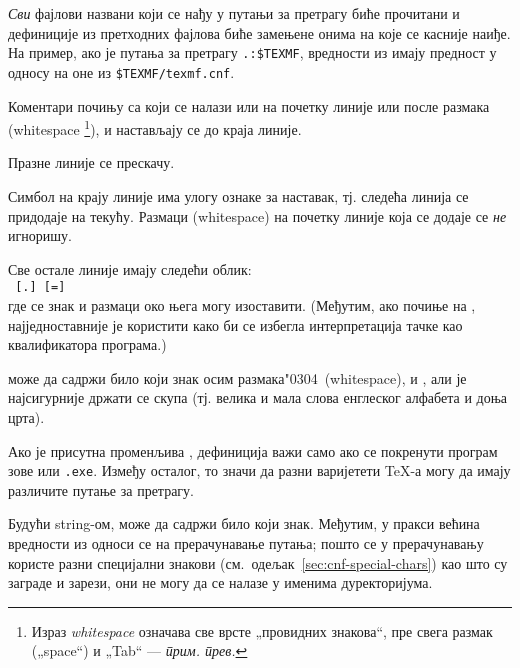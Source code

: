 \documentclass{article}
\begin{document}
\emph{Сви} фајлови названи  који се нађу у путањи за
претрагу биће прочитани и дефиниције из претходних фајлова биће
замењене онима на које се касније наиђе. На пример, ако је путања за
претрагу \verb|.:$TEXMF|, вредности из  имају
предност у односу на оне из \verb|$TEXMF/texmf.cnf|.

\begin{itemize*}
\item
  Коментари почињу са \code{\%} који се налази или на почетку линије 
  или после размака (\textenglish{whitespace}%
\footnote{\textserbian{Израз \emph{whitespace} означава све врсте 
    „провидних знакова“, пре свега размак („\textenglish{space}“) и 
	„Tab“ --- \emph{прим. прев.}}}), и настављају се до краја линије.
\item
  Празне линије се прескачу.
\item
  Симбол \bs{} на крају линије има улогу ознаке за наставак, тј.
  следећа линија се придодаје на текућу. Размаци
  (\textenglish{whitespace}) на почетку линије која се додаје се 
  \emph{не} игноришу.
\item
  Све остале линије имају следећи облик:\\
  \hspace*{2em}\texttt{ \textrm{[}.\textrm{]}
   \textrm{[}=\textrm{]} }\\[1pt]
  
  где се знак \samp{=} и размаци око њега могу изоставити. (Међутим,
  ако  почиње на , најједноставније је користити
  \samp{=} како би се избегла интерпретација тачке као квалификатора
  програма.)
\item
   може да садржи било који знак осим
  размака\char"0304\ (\textenglish{whitespace}), \samp{=} и ,
  али је најсигурније држати се скупа  (тј. велика и
  мала слова енглеског алфабета и доња црта).
\item
  Ако је присутна променљива , дефиниција
  важи само ако се покренути програм зове \texttt{}
  или \texttt{.exe}. Између осталог, то значи да
  разни варијетети \TeX{}-а могу да имају различите путање за претрагу.
\item
  Будући string-ом,  може да садржи било који знак.
  Међутим, у пракси већина вредности из  односи се на
  прерачунавање путања; пошто се у прерачунавању користе разни 
  специјални знакови (см.~одељак~\ref{sec:cnf-special-chars}) као што 
  су заграде и зарези, они не могу да се налазе у именима дуректоријума.


\end{itemize*}
\end{document}

